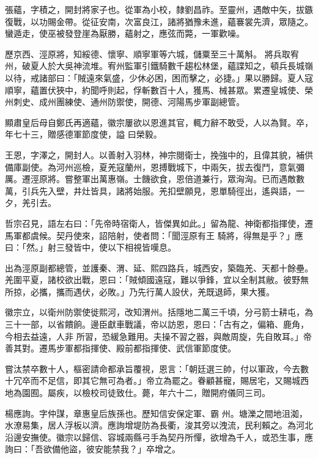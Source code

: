 \begin{pinyinscope}
 張蘊，字積之，開封將家子也。從軍為小校，隸劉昌祚。至靈州，遇敵中矢，拔鏃復戰，以功賜金帶。從征安南，次富良江，諸將猶豫未進，蘊褰裳先濟，眾隨之。蠻遁走，使巫被發登崖為厭勝，蘊射之，應弦而斃，一軍歡噪。



 歷京西、涇原將，知綏德、懷寧、順寧軍等六城，儲粟至三十萬斛。
 將兵取宥州，破夏人於大吳神流堆。宥州監軍引鐵騎數千趨松林堡，蘊諜知之，頓兵長城嶺以待，戒諸部曰：「賊遠來氣盛，少休必困，困而擊之，必捷。」果以勝歸。夏人寇順寧，蘊置伏狹中，約聞呼則起，俘斬數百十人，獲馬、械甚眾。累遷皇城使、榮州刺史、成州團練使、通州防禦使，開德、河陽馬步軍副總管。



 顯肅皇后母自鄭氏再適蘊，徽宗屢欲以恩進其官，輒力辭不敢受，人以為賢。卒，年七十三，贈感德軍節度使，謚
 曰榮毅。



 王恩，字澤之，開封人。以善射入羽林，神宗閱衛士，挽強中的，且偉其貌，補供備庫副使。為河州巡檢，夏羌寇蘭州，恩搏戰城下，中兩矢，拔去復鬥，意氣彌厲。遷涇原將。嘗整軍出萬惠嶺。士饑欲食，恩倍道兼行，眾洶洶。已而遇敵數萬，引兵先入壁，井灶皆具，諸將始服。羌扣壁願見，恩單騎徑出，遙與語，一夕，羌引去。



 哲宗召見，語左右曰：「先帝時宿衛人，皆傑異如此。」留為龍、神衛都指揮使，遷馬軍都虞候。契丹使來，詔陪射，使者問：「聞涇原有王
 騎將，得無是乎？」應曰：「然。」射三發皆中，使以下相視皆嘆息。



 出為涇原副都總管，並護秦、渭、延、熙四路兵，城西安，築臨羌、天都十餘壘。羌圍平夏，諸校欲出戰，恩曰：「賊傾國遠寇，難以爭鋒，宜以全制其敝。彼野無所掠，必攜，攜而遇伏，必敗。」乃先行萬人設伏，羌既退師，果大獲。



 徽宗立，以衛州防禦使徙熙河，改知渭州。括隱地二萬三千頃，分弓箭士耕屯，為三十一部，以省饋餉。邊臣獻車戰議，帝以訪恩，恩曰：「古有之，偏箱、鹿角，今相去益遠，人非
 所習，恐緩急難用。夫操不習之器，與敵周旋，先自敗耳。」帝善其對。遷馬步軍都指揮使、殿前都指揮使、武信軍節度使。



 嘗汰禁卒數十人，樞密請命都承旨覆視，恩言：「朝廷選三帥，付以軍政，今去數十冗卒而不足信，即其它無可為者。」帝立為罷之。眷顧甚寵，賜居宅，又賜城西地為園囿。屬疾，以檢校司徒致仕。薨，年六十二，贈開府儀同三司。



 楊應詢。字仲謀，章惠皇后族孫也。歷知信安保定軍、霸
 州。塘濼之間地沮洳，水潦易集，居人浮板以濟。應詢增堤防為長衢，浚其旁以洩流，民利賴之。為河北沿邊安撫使。徽宗以歸信、容城兩縣弓手為契丹所憚，欲增為千人，或恐生事，應詢曰：「吾欲備他盜，彼安能禁我？」卒增之。




\end{pinyinscope}
